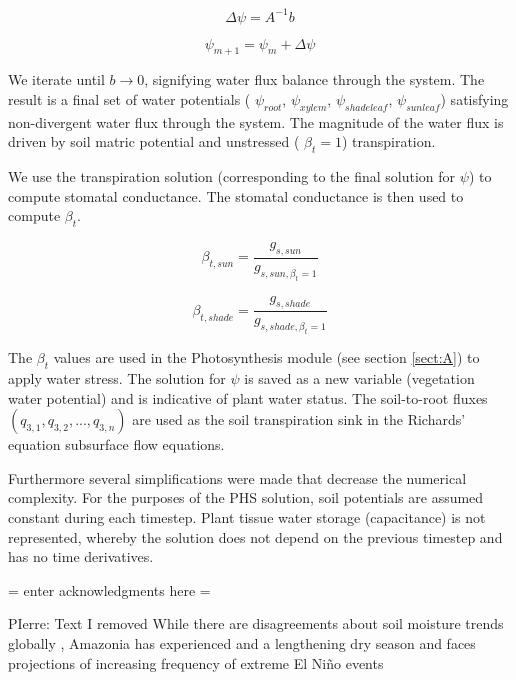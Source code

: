 \documentclass[draft,linenumbers]{agujournal}
\begin{document}
   \begin{linenomath*} \begin{equation} 
   \Delta\psi=A^{-1}b
   \end{equation} \end{linenomath*}

   \begin{linenomath*} \begin{equation} 
   \psi_{m+1}=\psi_m+\Delta\psi
   \end{equation} \end{linenomath*}

We iterate until $b\to 0$, signifying water flux balance through the system. The result is a final set of water potentials ( $\psi_{root}$, $\psi_{xylem}$, $\psi_{shadeleaf}$, $\psi_{sunleaf}$) satisfying non-divergent water flux through the system. 
The magnitude of the water flux is driven by soil matric potential and unstressed ( $\beta_t=1$) transpiration. 

We use the transpiration solution (corresponding to the final solution for $\psi$) to compute stomatal conductance. The stomatal conductance is then used to compute $\beta_t$. 

   \begin{linenomath*} \begin{equation} 
   \beta_{t,sun} = \dfrac{g_{s,sun}}{g_{s,sun,\beta_t=1}} 
   \end{equation} \end{linenomath*}

   \begin{linenomath*} \begin{equation} 
   \beta_{t,shade} = \dfrac{g_{s,shade}}{g_{s,shade,\beta_t=1}} 
   \end{equation} \end{linenomath*}

The $\beta_t$ values are used in the Photosynthesis module (see section \ref{sect:A}) to apply water stress. 
The solution for $\psi$ is saved as a new variable (vegetation water potential) and is indicative of plant water status.
The soil-to-root fluxes $\left( q_{3,1},q_{3,2},\text{...},q_{3,n}\right)$ are used as the soil transpiration sink in the Richards' equation subsurface flow equations.

    Furthermore several simplifications were made that decrease the numerical complexity.
    For the purposes of the PHS solution, soil potentials are assumed constant during each timestep.
    Plant tissue water storage (capacitance) is not represented, whereby the solution does not
    depend on the previous timestep and has no time derivatives.

\acknowledgments
 = enter acknowledgments here =

PIerre: Text I removed
While there are disagreements about soil moisture trends globally \citep{dai2013,sheffield2012}, 
Amazonia has experienced and a lengthening dry season \citep{fu2013} and faces projections of increasing frequency of extreme El Ni\~no events \citep{cai2014}

\nocite{*} 



\listofchanges
\end{document}
